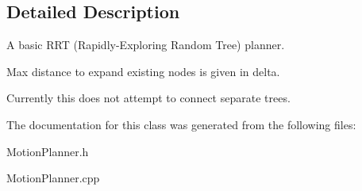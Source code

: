 \subsection{Detailed Description}
A basic R\+RT (Rapidly-\/\+Exploring Random Tree) planner. 

Max distance to expand existing nodes is given in delta.

Currently this does not attempt to connect separate trees. 

The documentation for this class was generated from the following files\+:\begin{DoxyCompactItemize}
\item 
Motion\+Planner.\+h\item 
Motion\+Planner.\+cpp\end{DoxyCompactItemize}
